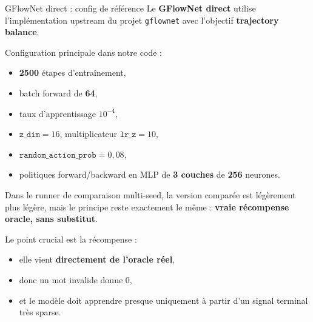 \documentclass[aspectratio=169,10pt]{beamer}
\newcommand{\code}[1]{\texttt{#1}}
\begin{document}
\begin{frame}{GFlowNet direct : config de référence}
\justifying
\small
Le \textbf{GFlowNet direct} utilise l'implémentation upstream du projet
\code{gflownet} avec l'objectif \textbf{trajectory balance}.

\vspace{0.5em}
Configuration principale dans notre code :
\begin{itemize}
  \item \textbf{2500} étapes d'entraînement,
  \item batch forward de \textbf{64},
  \item taux d'apprentissage \textbf{\(10^{-4}\)},
  \item \(\texttt{z\_dim}=16\), multiplicateur \(\texttt{lr\_z}=10\),
  \item \(\texttt{random\_action\_prob}=0{,}08\),
  \item politiques forward/backward en MLP de \textbf{3 couches} de
  \textbf{256} neurones.
\end{itemize}

\vspace{0.4em}
Dans le runner de comparaison multi-seed, la version comparée est légèrement
plus légère, mais le principe reste exactement le même : \textbf{vraie
récompense oracle, sans substitut}.

\vspace{0.5em}
Le point crucial est la récompense :
\begin{itemize}
  \item elle vient \textbf{directement de l'oracle réel},
  \item donc un mot invalide donne \(0\),
  \item et le modèle doit apprendre presque uniquement à partir d'un signal
  terminal très sparse.
\end{itemize}
\end{frame}
\end{document}
